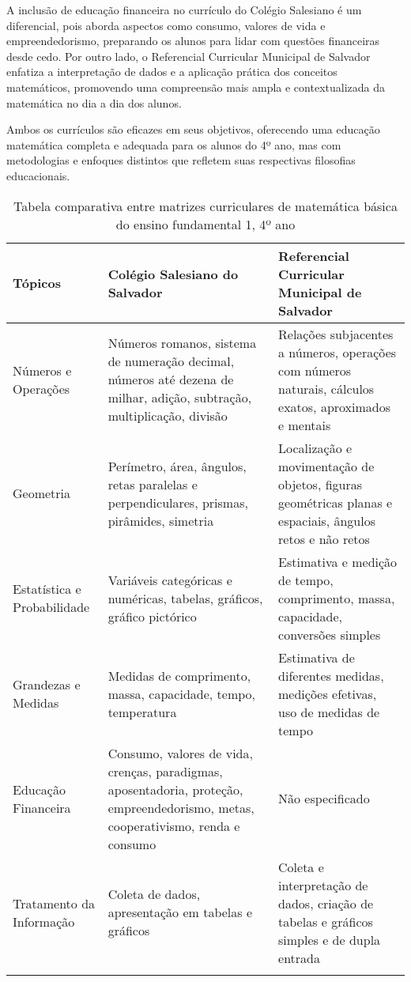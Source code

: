 A inclusão de educação financeira no currículo do Colégio Salesiano é um diferencial, pois aborda aspectos como consumo, valores de vida e empreendedorismo, preparando os alunos para lidar com questões financeiras desde cedo. Por outro lado, o Referencial Curricular Municipal de Salvador enfatiza a interpretação de dados e a aplicação prática dos conceitos matemáticos, promovendo uma compreensão mais ampla e contextualizada da matemática no dia a dia dos alunos.

Ambos os currículos são eficazes em seus objetivos, oferecendo uma educação matemática completa e adequada para os alunos do 4º ano, mas com metodologias e enfoques distintos que refletem suas respectivas filosofias educacionais.

\begin{longtable}{|p{3cm}|p{6cm}|p{6cm}|}
\hline
\textbf{Tópicos} & \textbf{Colégio Salesiano do Salvador} & \textbf{Referencial Curricular Municipal de Salvador} \\
\hline
Números e Operações & Números romanos, sistema de numeração decimal, números até dezena de milhar, adição, subtração, multiplicação, divisão & Relações subjacentes a números, operações com números naturais, cálculos exatos, aproximados e mentais \\
\hline
Geometria & Perímetro, área, ângulos, retas paralelas e perpendiculares, prismas, pirâmides, simetria & Localização e movimentação de objetos, figuras geométricas planas e espaciais, ângulos retos e não retos \\
\hline
Estatística e Probabilidade & Variáveis categóricas e numéricas, tabelas, gráficos, gráfico pictórico & Estimativa e medição de tempo, comprimento, massa, capacidade, conversões simples \\
\hline
Grandezas e Medidas & Medidas de comprimento, massa, capacidade, tempo, temperatura & Estimativa de diferentes medidas, medições efetivas, uso de medidas de tempo \\
\hline
Educação Financeira & Consumo, valores de vida, crenças, paradigmas, aposentadoria, proteção, empreendedorismo, metas, cooperativismo, renda e consumo & Não especificado \\
\hline
Tratamento da Informação & Coleta de dados, apresentação em tabelas e gráficos & Coleta e interpretação de dados, criação de tabelas e gráficos simples e de dupla entrada \\
\hline
\caption{Tabela comparativa entre matrizes curriculares de matemática básica do ensino fundamental 1, 4º ano}
\label{tab:comparacao_matrizes}
\end{longtable}

